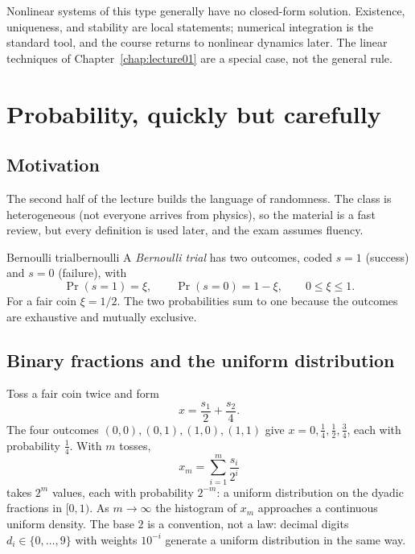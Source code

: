 \begin{remark}
Nonlinear systems of this type generally have no closed-form solution. Existence, uniqueness, and stability are local statements; numerical integration is the standard tool, and the course returns to nonlinear dynamics later. The linear techniques of Chapter~\ref{chap:lecture01} are a special case, not the general rule.
\end{remark}

\section{Probability, quickly but carefully}\label{sec:lec02:probability}

\subsection*{Motivation}
The second half of the lecture builds the language of randomness. The class is heterogeneous (not everyone arrives from physics), so the material is a fast review, but every definition is used later, and the exam assumes fluency.

\begin{definition}{Bernoulli trial}{bernoulli}
A \emph{Bernoulli trial} has two outcomes, coded $s=1$ (success) and $s=0$ (failure), with
\begin{equation}\label{eq:lec02:bernoulli}
\Pr(s=1)=\xi,\qquad \Pr(s=0)=1-\xi,\qquad 0\leq\xi\leq1.
\end{equation}
For a fair coin $\xi=1/2$. The two probabilities sum to one because the outcomes are exhaustive and mutually exclusive.
\end{definition}

\subsection{Binary fractions and the uniform distribution}\label{subsec:lec02:binary}
Toss a fair coin twice and form
\begin{equation}\label{eq:lec02:binary-fraction}
x=\frac{s_1}{2}+\frac{s_2}{4}.
\end{equation}
The four outcomes $(0,0),(0,1),(1,0),(1,1)$ give $x=0,\tfrac14,\tfrac12,\tfrac34$, each with probability $\tfrac14$. With $m$ tosses,
\begin{equation}\label{eq:lec02:binary-general}
x_m=\sum_{i=1}^{m}\frac{s_i}{2^i}
\end{equation}
takes $2^m$ values, each with probability $2^{-m}$: a uniform distribution on the dyadic fractions in $[0,1)$. As $m\to\infty$ the histogram of $x_m$ approaches a continuous uniform density. The base $2$ is a convention, not a law: decimal digits $d_i\in\{0,\dots,9\}$ with weights $10^{-i}$ generate a uniform distribution in the same way.


